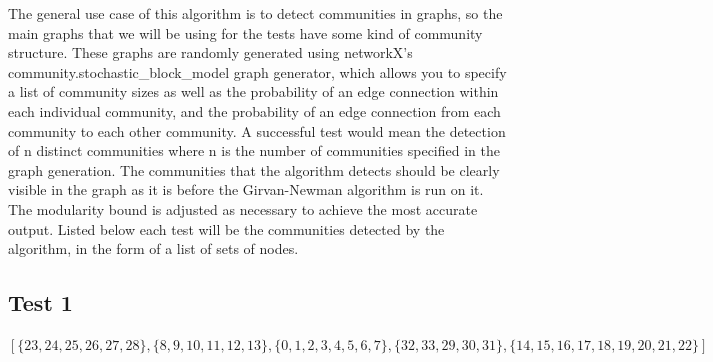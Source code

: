 \documentclass{article}
\begin{document}
The general use case of this algorithm is to detect communities in graphs, so the main graphs that we will be using for the tests have some kind of community structure.  These graphs are randomly generated using networkX's community.stochastic\_block\_model graph generator, which allows you to specify a list of community sizes as well as the probability of an edge connection within each individual community, and the probability of an edge connection from each community to each other community.  A successful test would mean the detection of n distinct communities where n is the number of communities specified in the graph generation.  The communities that the algorithm detects should be clearly visible in the graph as it is before the Girvan-Newman algorithm is run on it.  The modularity bound is adjusted as necessary to achieve the most accurate output.  Listed below each test will be the communities detected by the algorithm, in the form of a list of sets of nodes.


\subsection{Test 1}
    \begin{center}
    \end{center}
    $[\{23, 24, 25, 26, 27, 28\}, \{8, 9, 10, 11, 12, 13\}, \{0, 1, 2, 3, 4, 5, 6, 7\}, \{32, 33, 29, 30, 31\}, \{14, 15, 16, 17, 18, 19, 20, 21, 22\}]$
\end{document}
